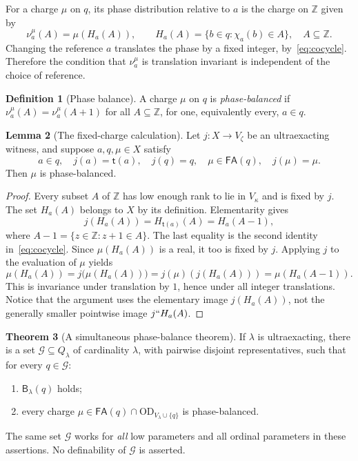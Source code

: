 \documentclass[11pt,letterpaper]{article}
\theoremstyle{definition}
\newtheorem{definition}{Definition}[section]
\newtheorem{theorem}[definition]{Theorem}
\newtheorem{lemma}[definition]{Lemma}
\newcommand{\OD}{\mathrm{OD}}
\newcommand{\FA}{\mathsf{FA}}
\newcommand{\Blam}[1]{\mathsf B_\lambda(#1)}
\newcommand{\ODq}{\OD_{V_\lambda\cup\{q\}}}
\newcommand{\Qlam}{Q_\lambda}
\newcommand{\tail}{\mathsf t}
\begin{document}
For a charge $\mu$ on $q$, its phase distribution relative to $a$ is the charge on $\mathbb Z$ given by
\[
 \nu_a^\mu(A)=\mu(H_a(A)),\qquad
 H_a(A)=\{b\in q:\chi_a(b)\in A\},\quad A\subseteq\mathbb Z.
\]
Changing the reference $a$ translates the phase by a fixed integer, by~\eqref{eq:cocycle}. Therefore the condition that $\nu_a^\mu$ is translation invariant is independent of the choice of reference.

\begin{definition}[Phase balance]
A charge $\mu$ on $q$ is \emph{phase-balanced} if $\nu_a^\mu(A)=\nu_a^\mu(A+1)$ for all $A\subseteq\mathbb Z$, for one, equivalently every, $a\in q$.
\end{definition}

\begin{lemma}[The fixed-charge calculation]\label{lem:fixedcharge}
Let $j:X\to V_\zeta$ be an ultraexacting witness, and suppose $a,q,\mu\in X$ satisfy
\[
 a\in q,\quad j(a)=\tail(a),\quad j(q)=q,
 \quad \mu\in\FA(q),\quad j(\mu)=\mu.
\]
Then $\mu$ is phase-balanced.
\end{lemma}

\begin{proof}
Every subset $A$ of $\mathbb Z$ has low enough rank to lie in $V_\kappa$ and is fixed by $j$. The set $H_a(A)$ belongs to $X$ by its definition. Elementarity gives
\[
 j(H_a(A))=H_{\tail(a)}(A)=H_a(A-1),
\]
where $A-1=\{z\in\mathbb Z:z+1\in A\}$. The last equality is the second identity in~\eqref{eq:cocycle}. Since $\mu(H_a(A))$ is a real, it too is fixed by $j$. Applying $j$ to the evaluation of $\mu$ yields
\[
 \mu(H_a(A))
 =j\bigl(\mu(H_a(A))\bigr)
 =j(\mu)(j(H_a(A)))
 =\mu(H_a(A-1)).
\]
This is invariance under translation by $1$, hence under all integer translations. Notice that the argument uses the elementary image $j(H_a(A))$, not the generally smaller pointwise image $j``H_a(A)$.
\end{proof}

\begin{theorem}[A simultaneous phase-balance theorem]\label{thm:balance}
If $\lambda$ is ultraexacting, there is a set $\mathcal G\subseteq\Qlam$ of cardinality $\lambda$, with pairwise disjoint representatives, such that for every $q\in\mathcal G$:
\begin{enumerate}
\item $\Blam q$ holds;
\item every charge $\mu\in\FA(q)\cap\ODq$ is phase-balanced.
\end{enumerate}
The same set $\mathcal G$ works for \emph{all} low parameters and all ordinal parameters in these assertions. No definability of $\mathcal G$ is asserted.
\end{theorem}
\end{document}
